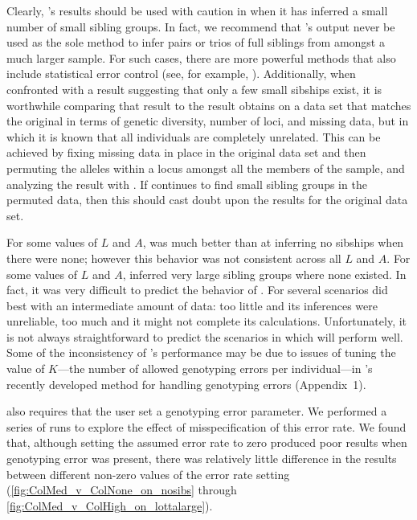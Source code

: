\documentclass[11pt]{article}
\begin{document}
{Clearly, \colony{}'s results should be used with caution in when it has inferred a small number of 
small sibling groups.  In fact, we recommend that \colony{}'s output never be used as the sole method 
to infer pairs or trios of full siblings from amongst a much larger sample. For such cases, there are 
more powerful methods that also include statistical error control (see, for example, 
\citealt{almudevar01b}).  Additionally, when confronted with a \colony{} result suggesting that only a 
few small sibships exist, it is worthwhile comparing that result to the result \colony{} obtains on a 
data set that matches the original in terms of genetic diversity, number of loci, and missing data, but 
in which it is known that all individuals are completely unrelated.  This can be achieved by fixing 
missing data in place in the original data set and then permuting the alleles within a locus amongst 
all the members of the sample, and analyzing the result with \colony{}.  If \colony{} continues to find 
small sibling groups in the permuted data, then this should cast doubt upon the \colony{} results for 
the original data set. 

For some values of $L$ and $A$, \prt{} was much better than \colony{} at inferring no sibships when 
there were none; however this behavior was not consistent across all $L$ and $A$.  For some values of 
$L$ and $A$, \prt{} inferred very large sibling groups where none existed. In fact, it was very 
difficult to predict the behavior of \prt{}.  For several scenarios \prt{} did best with an 
intermediate amount of data: too little and its inferences were unreliable, too much and it might not 
complete its calculations.  Unfortunately, it is not always straightforward to predict the scenarios in 
which \prt{} will perform well.  Some of the inconsistency of \prt{}'s performance may be due to issues 
of tuning the value of $K$---the number of allowed genotyping errors per individual---in \prt{}'s 
recently developed method for handling genotyping errors (Appendix~1).

\colony{} also requires that the user set a genotyping error parameter.  We performed a series of 
\colony{} runs to explore the effect of misspecification of this error rate.  We found that, although 
setting the assumed error rate to zero produced poor results when genotyping error was present, there 
was relatively little difference in the results between different non-zero values of the error rate 
setting (\ref{fig:ColMed_v_ColNone_on_nosibs} through \ref{fig:ColMed_v_ColHigh_on_lottalarge}).

}
\end{document}
